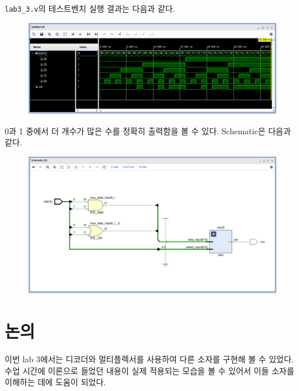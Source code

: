 \documentclass{scrartcl}
\begin{document}
\texttt{lab3\_3.v}의 테스트벤치 실행 결과는 다음과 같다.
\begin{figure}[H]
  \centering
  \includegraphics[width=\linewidth]{lab3_3_waveform}
\end{figure}
0과 1 중에서 더 개수가 많은 수를 정확히 출력함을 볼 수 있다.
Schematic은 다음과 같다.
\begin{figure}[H]
  \centering
  \includegraphics[width=\linewidth]{lab3_3_schematic}
\end{figure}

\section{논의}
이번 lab 3에서는 디코더와 멀티플렉서를 사용하여 다른 소자를 구현해 볼 수 있었다.
수업 시간에 이론으로 들었던 내용이 실제 적용되는 모습을 볼 수 있어서 이들 소자를 이해하는 데에 도움이 되었다.
\end{document}
